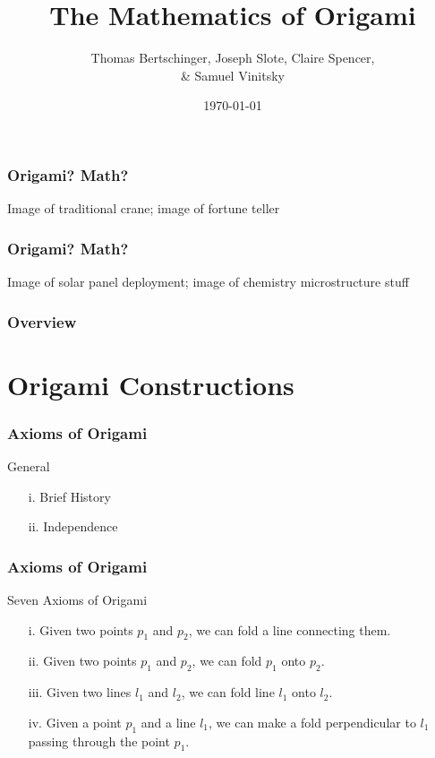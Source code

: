 \documentclass{beamer}
\title[Origami]{The Mathematics of Origami} %
\author[T. Bertschinger, J. Slote, C. Spencer, S. Vinitsky]{Thomas Bertschinger, Joseph Slote, Claire Spencer, \\ \& Samuel Vinitsky} %
\institute[Carleton] %
{
Carleton College \\ %
\medskip
}
\date{\today} %
\begin{document}
\begin{frame}
\titlepage %
\end{frame}

\begin{frame}
\frametitle{Origami? Math?}
Image of traditional crane; image of fortune teller
\end{frame}

\begin{frame}
\frametitle{Origami? Math?}
Image of solar panel deployment; image of chemistry microstructure stuff
\end{frame}

\begin{frame}
\frametitle{Overview} %
\tableofcontents %
\end{frame}


\section{Origami Constructions}

\begin{frame}
\frametitle{Axioms of Origami}
\begin{block}{General}
\begin{enumerate}
\item[i.]
Brief History
\item[ii.]
Independence
\end{enumerate}
\end{block}
\end{frame}

\begin{frame}
\frametitle{Axioms of Origami}
\begin{block}{Seven Axioms of Origami}
\begin{enumerate}
\item[i.]
Given two points $p_1$ and $p_2$, we can fold a line connecting them.
\item[ii.]
Given two points $p_1$ and $p_2$, we can fold $p_1$ onto $p_2$.
\item[iii.]
Given two lines $l_1$ and $l_2$, we can fold line $l_1$ onto $l_2$.
\item[iv.]
Given a point $p_1$ and a line $l_1$, we can make a fold perpendicular to $l_1$ passing through the point $p_1$.
\end{enumerate}
\end{block}
\end{frame}
\end{document}
